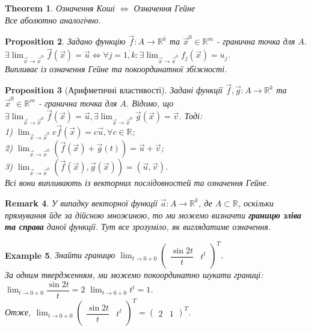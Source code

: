 \documentclass[a4paper, 10pt]{article}
\def\huge{\displaystyle}
\theoremstyle{theoremdd}
\newtheorem{theorem}{Theorem}[subsection]
\theoremstyle{theoremdd}
\theoremstyle{theoremdd}
\theoremstyle{theoremdd}
\theoremstyle{theoremdd}
\newtheorem{example}[theorem]{Example}
\theoremstyle{theoremdd}
\newtheorem{proposition}[theorem]{Proposition}
\theoremstyle{theoremdd}
\newtheorem{remark}[theorem]{Remark}
\theoremstyle{theoremdd}
\theoremstyle{theoremdd}
\begin{document}
\begin{theorem}
Означення Коші $\iff$ Означення Гейне\\
\textit{Все аболютно аналогічно.}
\end{theorem}

\begin{proposition}
Задано функцію $\vec{f}: A \to \mathbb{R}^k$ та $\vec{x}^0 \in \mathbb{R}^m$ - гранична точка для $A$.\\
$\exists \huge\lim_{\vec{x} \to \vec{x}^0} \vec{f}(\vec{x}) = \vec{u} \iff \forall j = \overline{1,k}: \exists \lim_{\vec{x} \to \vec{x}^0} f_j(\vec{x}) = u_j$.\\
\textit{Випливає із означення Гейне та покоординатної збіжності.}
\end{proposition}

\begin{proposition}[Арифметичні властивості]
Задані функції $\vec{f},\vec{g}: A \to \mathbb{R}^k$ та $\vec{x}^0 \in \mathbb{R}^m$ - гранична точка для $A$. Відомо, що \\ $\exists \huge \lim_{\vec{x} \to \vec{x}^0} \vec{f}(\vec{x}) = \vec{u}, \exists \lim_{\vec{x} \to \vec{x}^0} \vec{g}(\vec{x}) = \vec{v}$. Тоді:\\
1) $\huge \lim_{\vec{x} \to \vec{x}^0} c \vec{f}(\vec{x}) = c \vec{u}, \forall c \in \mathbb{R}$;\\
2) $\huge \lim_{\vec{x} \to \vec{x}^0} (\vec{f}(\vec{x}) + \vec{g}(t)) = \vec{u} + \vec{v}$;\\
3) $\huge \lim_{\vec{x} \to \vec{x}^0} (\vec{f}(\vec{x}),\vec{g}(\vec{x})) = (\vec{u},\vec{v})$.\\
\textit{Всі вони випливають із векторних послідовностей та означення Гейне.}
\end{proposition}

\begin{remark}
У випадку векторної функції $\vec{a}: A \to \mathbb{R}^k$, де $A \subset \mathbb{R}$, оскільки прямування йде за дійсною множиною, то ми можемо визначти \textbf{границю зліва та справа} даної функції. Тут все зрозуміло, як виглядатиме означення.
\end{remark}

\begin{example}
Знайти границю $\huge\lim_{t \to 0+0} \begin{pmatrix}
\dfrac{\sin 2t}{t} & t^t
\end{pmatrix}^T$.\\
За одним твердженням, ми можемо покоординатно шукати границі:\\
$\huge\lim_{t \to 0+0} \dfrac{\sin 2t}{t} = 2$ \hspace{1cm} $\huge\lim_{t \to 0+0} t^t = 1$.\\
Отже, $\huge\lim_{t \to 0+0} \begin{pmatrix}
\dfrac{\sin 2t}{t} & t^t
\end{pmatrix}^T = \begin{pmatrix}
2 & 1
\end{pmatrix}^T$.
\end{example}
\end{document}
